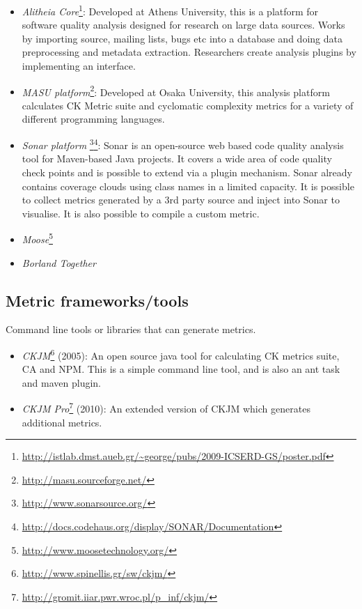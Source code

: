 \begin{itemize}

	\item \textit{Alitheia Core}\footnote{\url{http://istlab.dmst.aueb.gr/~george/pubs/2009-ICSERD-GS/poster.pdf}}: Developed at Athens University, this is a platform for software quality analysis designed for research on large data sources. Works by importing source, mailing lists, bugs etc into a database and doing data preprocessing and metadata extraction. Researchers create analysis plugins by implementing an interface. 

	\item \textit{MASU platform}\footnote{\url{http://masu.sourceforge.net/}}: Developed at Osaka University, this analysis platform calculates CK Metric suite and cyclomatic complexity metrics for a variety of different programming languages.

	\item \textit{Sonar platform} \footnote{\url{http://www.sonarsource.org/}}\footnote{\url{http://docs.codehaus.org/display/SONAR/Documentation}}: Sonar is an open-source web based code quality analysis tool for Maven-based Java projects. It covers a wide area of code quality check points and is possible to extend via a plugin mechanism. Sonar already contains coverage clouds using class names in a limited capacity. It is possible to collect metrics generated by a 3rd party source and inject into Sonar to visualise. It is also possible to compile a custom metric.

	\item \textit{Moose}\footnote{\url{http://www.moosetechnology.org/}}

	\item \textit{Borland Together} 

\end{itemize}

\subsection{Metric frameworks/tools}\label{sect:met}

Command line tools or libraries that can generate metrics.

\begin{itemize}

	\item \textit{CKJM}\footnote{\url{http://www.spinellis.gr/sw/ckjm/}} (2005):  An open source java tool for calculating CK metrics suite, CA and NPM. This is a simple command line tool, and is also an ant task and maven plugin. 

	\item \textit{CKJM Pro}\footnote{\url{http://gromit.iiar.pwr.wroc.pl/p_inf/ckjm/}} (2010): An extended version of CKJM which generates additional metrics.

\end{itemize}

